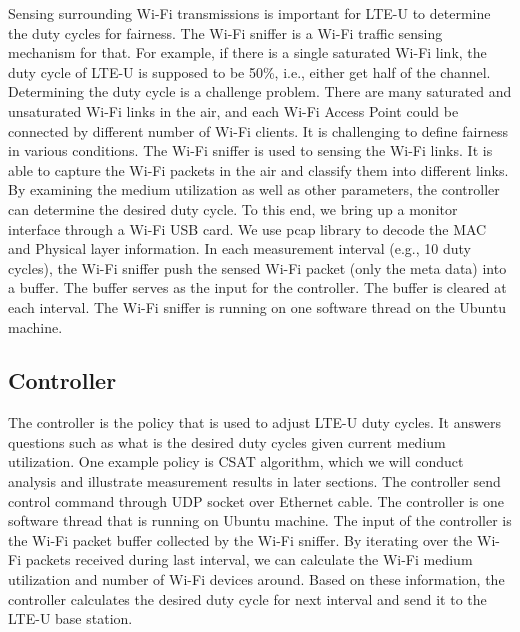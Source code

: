Sensing surrounding Wi-Fi transmissions is important for LTE-U to 
determine the duty cycles for fairness.
The Wi-Fi sniffer is a Wi-Fi traffic sensing mechanism for that. 
For example, if there is a single saturated Wi-Fi link, 
the duty cycle of LTE-U is supposed to be 50\%, 
i.e., either get half of the channel. 
Determining the duty cycle is a challenge problem. 
There are many saturated and unsaturated Wi-Fi links
in the air, and each Wi-Fi Access Point could
be connected by different number of Wi-Fi clients. 
It is challenging to define fairness in various conditions. 
The Wi-Fi sniffer is used to sensing the Wi-Fi links. 
It is able to capture the Wi-Fi packets in the air
and classify them into different links. 
By examining the medium utilization as well as
other parameters, the controller can determine 
the desired duty cycle. 
To this end, we bring up a monitor interface through
a Wi-Fi USB card. 
We use pcap library to decode the MAC and Physical
layer information. 
In each measurement interval (e.g., 10 duty cycles), 
the Wi-Fi sniffer push the sensed Wi-Fi 
packet (only the meta data) into a buffer. 
The buffer serves as the input for the controller. 
The buffer is cleared at each interval. 
The Wi-Fi sniffer is running on one software
thread on the Ubuntu machine. 

\subsection{Controller}

The controller is the policy that is used to adjust LTE-U duty cycles. 
It answers questions such as what is the desired duty cycles
given current medium utilization. 
One example policy is CSAT algorithm, 
which we will conduct analysis and illustrate measurement
results in later sections. 
The controller send control command through UDP socket
over Ethernet cable. 
The controller is one software thread that is running
on Ubuntu machine. 
The input of the controller is the Wi-Fi packet
buffer collected by the Wi-Fi sniffer.
By iterating over the Wi-Fi packets received during
last interval, we can calculate the Wi-Fi medium
utilization and number of Wi-Fi devices around. 
Based on these information, the controller
calculates the desired duty cycle for next interval
and send it to the LTE-U base station. 

